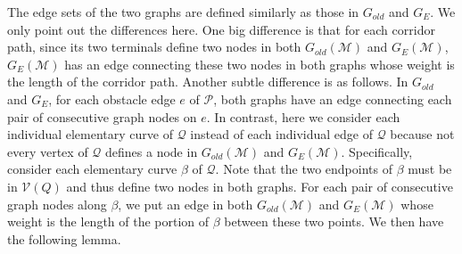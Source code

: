 \documentclass[english,runningheads,11pt]{llncs}
\def\calP{\mathcal{P}}
\def\calM{\mathcal{M}}
\def\calQ{\mathcal{Q}}
\def\calV{\mathcal{V}}
\begin{document}
The edge sets of the two graphs are defined similarly as
those in $G_{old}$ and $G_E$. We only point out the differences here.
One big difference is that for each corridor path, since its two terminals
define two nodes in both $G_{old}(\calM)$ and $G_E(\calM)$, $G_E(\calM)$ has
an edge connecting these two nodes in both graphs whose weight
is the length of the corridor path.
Another subtle difference is as follows.
In $G_{old}$ and $G_E$, for each obstacle edge $e$ of $\calP$, both
graphs have an edge connecting each pair of consecutive graph nodes
on $e$. In contrast, here we consider
each individual elementary curve of $\calQ$ instead of each
individual edge of $\calQ$ because not every vertex of
$\calQ$ defines a node in $G_{old}(\calM)$ and $G_E(\calM)$.
Specifically, consider each elementary curve $\beta$ of $\calQ$. Note that
the two endpoints of $\beta$ must be in $\calV(Q)$ and thus define two nodes
in both graphs. For each pair of consecutive graph nodes along $\beta$, we put an edge
in both $G_{old}(\calM)$ and $G_E(\calM)$ whose weight is the
length of the portion of $\beta$ between these two points.
We then have the following lemma.
\end{document}
